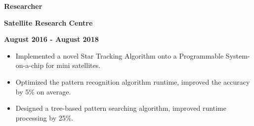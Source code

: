 \documentclass[10pt]{article}
\begin{document}
        \begin{multicols}{3}
            \begin{flushleft}
                \textbf{Researcher}
            \end{flushleft}

            \columnbreak

            \begin{center}
                \textbf{Satellite Research Centre}
            \end{center}

            \columnbreak

            \begin{flushright}
                \textbf{August 2016 - August 2018}
            \end{flushright}
        \end{multicols}

        \vspace{-5mm}
        \begin{itemize}[noitemsep]
            \item Implemented a novel Star Tracking Algorithm onto a Programmable System-on-a-chip for mini satellites.
            \item Optimized the pattern recognition algorithm runtime, improved the accuracy by 5\% on average.
            \item Designed a tree-based pattern searching algorithm, improved runtime processing by 25\%.
        \end{itemize}

    \vspace{2mm}
\end{document}
